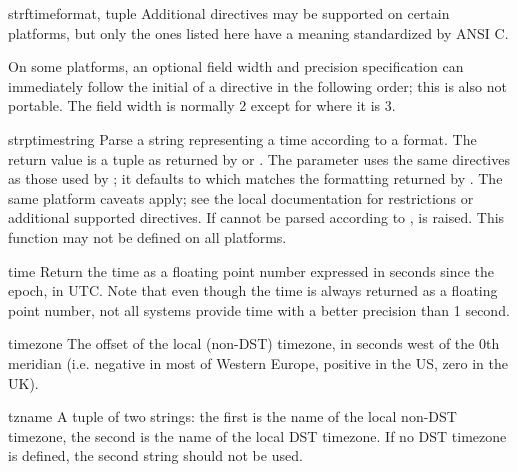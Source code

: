 \begin{funcdesc}{strftime}{format, tuple}
Additional directives may be supported on certain platforms, but
only the ones listed here have a meaning standardized by ANSI C.

On some platforms, an optional field width and precision
specification can immediately follow the initial \character{\%} of a
directive in the following order; this is also not portable.
The field width is normally 2 except for  where it is 3.
\end{funcdesc}

\begin{funcdesc}{strptime}{string}
Parse a string representing a time according to a format.  The return 
value is a tuple as returned by  or
.  The  parameter uses the same
directives as those used by ; it defaults to
 which matches the formatting
returned by .  The same platform caveats apply; see
the local \UNIX{} documentation for restrictions or additional
supported directives.  If  cannot be parsed according to
,  is raised.  This function may not
be defined on all platforms.
\end{funcdesc}

\begin{funcdesc}{time}{}
Return the time as a floating point number expressed in seconds since
the epoch, in UTC.  Note that even though the time is always returned
as a floating point number, not all systems provide time with a better
precision than 1 second.
\end{funcdesc}

\begin{datadesc}{timezone}
The offset of the local (non-DST) timezone, in seconds west of the 0th
meridian (i.e. negative in most of Western Europe, positive in the US,
zero in the UK).
\end{datadesc}

\begin{datadesc}{tzname}
A tuple of two strings: the first is the name of the local non-DST
timezone, the second is the name of the local DST timezone.  If no DST
timezone is defined, the second string should not be used.
\end{datadesc}

